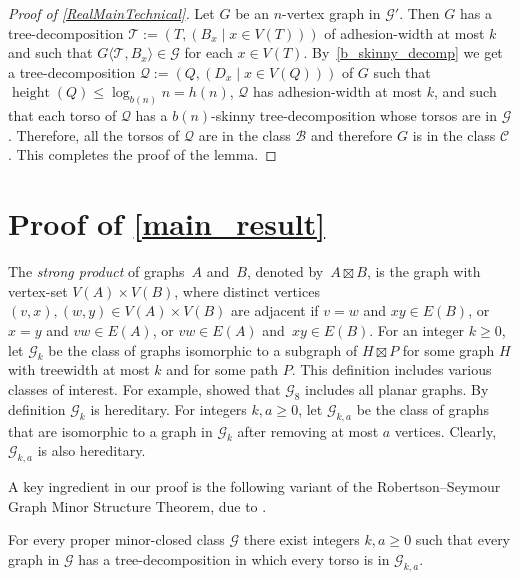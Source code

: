 \documentclass{patmorin}
\renewcommand{\le}{\leqslant}
\renewcommand{\geq}{\geqslant}
\newcommand{\defin}[1]{\emph{\textcolor{brightmaroon}{#1}}}
\newcommand{\torso}[2]{{#1}\langle{#2}\rangle}
\DeclareMathOperator{\height}{height}
\begin{document}
\begin{proof}[Proof of \cref{RealMainTechnical}]
    Let $G$ be an $n$-vertex graph in $\mathcal{G}'$.
    Then $G$ has a tree-decomposition $\mathcal{T}:=(T,(B_x\mid x\in V(T)))$ of adhesion-width at most $k$ and such that $\torso{G}{\mathcal{T},B_x}\in\mathcal{G}$ for each $x\in V(T)$.
By~\cref{b_skinny_decomp} we get a tree-decomposition $\mathcal{Q}:=(Q,(D_x \mid x\in V(Q)))$ of $G$ such that $\height(Q)\le\log_{b(n)} n = h(n)$, $\mathcal{Q}$ has adhesion-width at most $k$, and such that each torso of $\mathcal{Q}$ has a $b(n)$-skinny tree-decomposition whose torsos are in $\mathcal{G}$.
Therefore, all the torsos of $\mathcal{Q}$ are in the class $\mathcal{B}$ and therefore $G$ is in the class $\mathcal{C}$.  This completes the proof of the lemma.
\end{proof}


  \section{Proof of \cref{main_result}}
  \label{gpmst_section}

The \defin{strong product} of graphs~$A$ and~$B$, denoted by~${A \boxtimes B}$, is the graph with vertex-set ${V(A) \times V(B)}$, where distinct vertices ${(v,x),(w,y) \in V(A) \times V(B)}$ are adjacent if
	${v=w}$ and ${xy \in E(B)}$, or
	${x=y}$ and ${vw \in E(A)}$, or
	${vw \in E(A)}$ and~${xy \in E(B)}$.
For an integer $k\geq 0$, let \defin{$\mathcal{G}_{k}$} be the class of graphs isomorphic to a subgraph of $H\boxtimes P$ for some graph $H$ with treewidth at most $k$ and for some path $P$. This definition includes various classes of interest. For example, \citet{dujmovic.joret.ea:planar} showed that
$\mathcal{G}_{8}$ includes all planar graphs.
By definition $\mathcal{G}_k$ is hereditary.
For integers $k,a\geq 0$, let \defin{$\mathcal{G}_{k,a}$} be the class of graphs that are isomorphic to a graph in $\mathcal{G}_k$ after removing at most $a$ vertices.
Clearly, $\mathcal{G}_{k,a}$ is also hereditary.

A key ingredient in our proof is the following variant of the Robertson--Seymour Graph Minor Structure Theorem, due to \citet{dujmovic.joret.ea:planar}.
 \begin{thm}
  \label{gmpst}
  For every proper minor-closed class $\mathcal{G}$ there exist integers $k,a\geq 0$ such that every graph in $\mathcal{G}$ has a tree-decomposition in which every torso is in $\mathcal{G}_{k,a}$.
  \end{thm}
\end{document}
